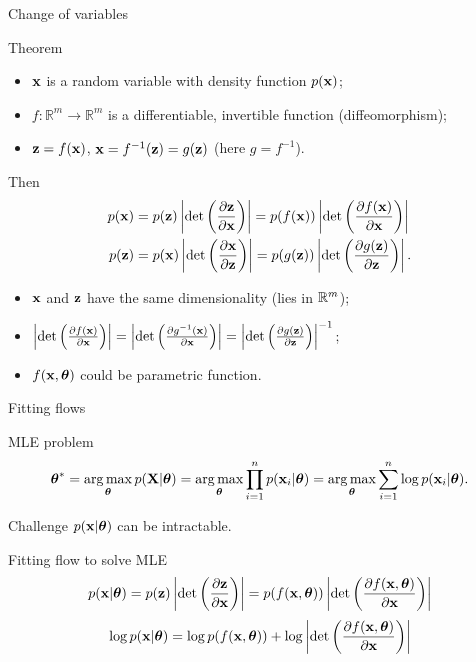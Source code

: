 \begin{frame}{Change of variables}
	\begin{block}{Theorem}
		\begin{itemize}
			\item $\mathbf{x}$ is a random variable with density function $p(\mathbf{x})$;
			\item $f: \mathbb{R}^m \rightarrow \mathbb{R}^m$ is a differentiable, invertible function (diffeomorphism);
			\item $\mathbf{z} = f(\mathbf{x})$, $\mathbf{x} = f^{-1}(\mathbf{z}) = g(\mathbf{z})$ (here $g = f^{-1}$).
		\end{itemize}
		Then
		\vspace{-0.3cm}
		\begin{align*}
			p(\mathbf{x}) &= p(\mathbf{z}) \left|\det \left(  \frac{\partial \mathbf{z}}{\partial \mathbf{x}} \right) \right| = p(f(\mathbf{x})) \left|\det \left(  \frac{\partial f(\mathbf{x})}{\partial \mathbf{x}} \right) \right| \\
			p(\mathbf{z}) &= p(\mathbf{x}) \left|\det \left(  \frac{\partial \mathbf{x}}{\partial \mathbf{z}} \right) \right| = p(g(\mathbf{z})) \left|\det \left(  \frac{\partial g(\mathbf{z})}{\partial \mathbf{z}} \right) \right|.
		\end{align*}
	\end{block}
		\begin{itemize}
			\item $\mathbf{x}$ and $\mathbf{z}$ have the same dimensionality (lies in $\mathbb{R}^m$);
			\item $ \left|\det \left(  \frac{\partial f(\mathbf{x})}{\partial \mathbf{x}} \right)\right| = \left|\det \left(  \frac{\partial g^{-1}(\mathbf{x})}{\partial \mathbf{x}} \right)\right| = \left|\det \left(  \frac{\partial g(\mathbf{z})}{\partial \mathbf{z}} \right)\right|^{-1}$;
			\item $f(\mathbf{x}, \boldsymbol{\theta})$ could be parametric function.
		\end{itemize}
\end{frame}
\begin{frame}{Fitting flows}
	\begin{block}{MLE problem}
		\vspace{-0.3cm}
		\[
		\boldsymbol{\theta}^* = \operatorname*{arg\,max}_{\boldsymbol{\theta}} p(\mathbf{X} | \boldsymbol{\theta}) = \operatorname*{arg\,max}_{\boldsymbol{\theta}} \prod_{i=1}^n p(\mathbf{x}_i | \boldsymbol{\theta}) = \operatorname*{arg\,max}_{\boldsymbol{\theta}} \sum_{i=1}^n \log p(\mathbf{x}_i | \boldsymbol{\theta}).
		\]
		\vspace{-0.3cm}
	\end{block}
	\begin{block}{Challenge}
		$p(\mathbf{x} | \boldsymbol{\theta})$ can be intractable.
	\end{block}
	\begin{block}{Fitting flow to solve MLE}
		\[
		p(\mathbf{x}|\boldsymbol{\theta}) = p(\mathbf{z}) \left|\det \left(  \frac{\partial \mathbf{z}}{\partial \mathbf{x}} \right) \right|  = p(f(\mathbf{x}, \boldsymbol{\theta})) \left|\det \left( \frac{\partial f(\mathbf{x}, \boldsymbol{\theta})}{\partial \mathbf{x}} \right) \right|
		\]
		\[
			\log p(\mathbf{x}|\boldsymbol{\theta}) = \log p(f(\mathbf{x}, \boldsymbol{\theta})) + \log  \left|\det \left( \frac{\partial f(\mathbf{x}, \boldsymbol{\theta})}{\partial \mathbf{x}} \right) \right|
		\]
	\end{block}
\end{frame}
